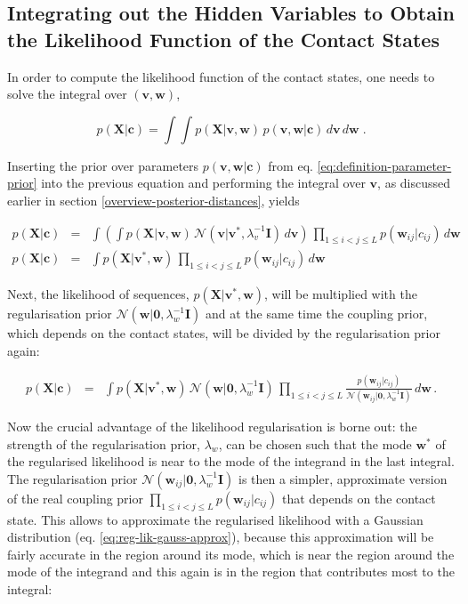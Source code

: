 \documentclass[11pt,a4paper,twoside]{book}
\newcommand{\Gauss}{\mathcal{N}}
\newcommand{\I}{\mathbf{I}}
\renewcommand{\c}{\mathbf{c}}
\newcommand{\cij}{c_{ij}}
\renewcommand{\v}{\mathbf{v}}
\newcommand{\w}{\mathbf{w}}
\newcommand{\wij}{\mathbf{w}_{ij}}
\newcommand{\X}{\mathbf{X}}
\theoremstyle{definition}
\theoremstyle{definition}
\theoremstyle{remark}
\begin{document}
\subsection{Integrating out the Hidden Variables to Obtain the
Likelihood Function of the Contact
States}\label{likelihood-fct-distances}

In order to compute the likelihood function of the contact states, one
needs to solve the integral over \((\v, \w)\),

\begin{equation}
    p(\X | \c) = \int \int p(\X | \v,\w) \, p(\v, \w | \c) \,d\v\,d\w \; .
\label{eq:likelihood-distances}
\end{equation}

Inserting the prior over parameters \(p(\v, \w | \c)\) from eq.
\eqref{eq:definition-parameter-prior} into the previous equation and
performing the integral over \(\v\), as discussed earlier in section
\ref{overview-posterior-distances}, yields

\begin{eqnarray}
    p(\X | \c) &=& \int \left( \int  p(\X | \v,\w) \, \Gauss(\v|\v^*,\lambda_v^{-1} \I) \,d\v \right) \, \prod_{1\le i<j\le L} p(\wij|\cij) \, d\w  \\
    p(\X | \c) &=& \int  p(\X | \v^*,\w) \, \prod_{1\le i<j\le L} p(\wij|\cij) \, d\w  
\label{eq:in-over-w-1}
\end{eqnarray}

Next, the likelihood of sequences, \(p(\X | \v^*,\w)\), will be
multiplied with the regularisation prior
\(\Gauss(\w|\mathbf{0}, \lambda_w^{-1} \I)\) and at the same time the
coupling prior, which depends on the contact states, will be divided by
the regularisation prior again:

\begin{eqnarray}
      p(\X | \c) &=& \int p(\X | \v^*,\w) \, \Gauss(\w|\mathbf{0}, \lambda_w^{-1} \I) \, \prod_{1\le i<j\le L} \frac{p(\wij|\cij)}{\Gauss(\wij|\mathbf{0}, \lambda_w^{-1} \I)} \,d\w \, .
\end{eqnarray}

Now the crucial advantage of the likelihood regularisation is borne out:
the strength of the regularisation prior, \(\lambda_w\), can be chosen
such that the mode \(\w^*\) of the regularised likelihood is near to the
mode of the integrand in the last integral. The regularisation prior
\(\Gauss(\wij|\mathbf{0}, \lambda_w^{-1} \I)\) is then a simpler,
approximate version of the real coupling prior
\(\prod_{1\le i<j\le L} p(\wij|\cij)\) that depends on the contact
state. This allows to approximate the regularised likelihood with a
Gaussian distribution (eq. \eqref{eq:reg-lik-gauss-approx}), because this
approximation will be fairly accurate in the region around its mode,
which is near the region around the mode of the integrand and this again
is in the region that contributes most to the integral:
\end{document}
